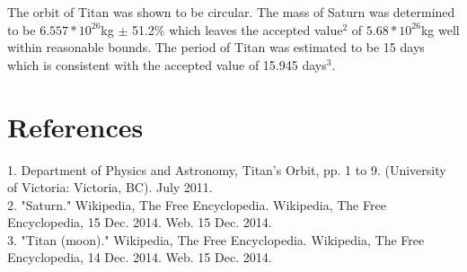 \documentclass{article}
\begin{document}
The orbit of Titan was shown to be circular. The mass of Saturn was determined to be $6.557*10^{26}$kg $\pm$ 51.2\% which leaves the accepted value$^2$ of $5.68*10^{26}$kg well within reasonable bounds. The period of Titan was estimated to be 15 days which is consistent with the accepted value of 15.945 days$^3$.
\section{References}
1. Department of Physics and Astronomy, Titan's Orbit, pp. 1 to 9. (University of Victoria: Victoria, BC). July 2011.\\
2. "Saturn." Wikipedia, The Free Encyclopedia. Wikipedia, The Free Encyclopedia, 15 Dec. 2014. Web. 15 Dec. 2014. \\
3. "Titan (moon)." Wikipedia, The Free Encyclopedia. Wikipedia, The Free Encyclopedia, 14 Dec. 2014. Web. 15 Dec. 2014. \\
\end{document}
